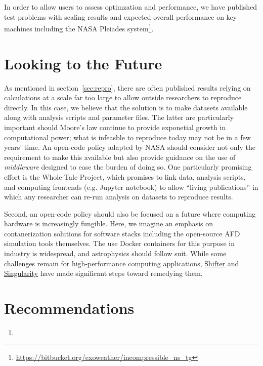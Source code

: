 \documentclass[12pt, titlepage]{aastex62}
\begin{document}
In order to allow users to assess optimzation and performance, we have published test problems with scaling results and expected overall performance on key machines including the NASA Pleiades system\footnote{\url{https://bitbucket.org/exoweather/incompressible_ns_tg}}. 

\section{Looking to the Future}
\label{sec:future}

As mentioned in section~\ref{sec:repro}, there are often published results relying on calculations at a scale far too large to allow outside researchers to reproduce directly. In this case, we believe that the solution is to make datasets available along with analysis scripts and parameter files. The latter are particularly important should Moore's law continue to provide exponetial growth in computational power; what is infeasble to reproduce today may not be in a few years' time. An open-code policy adapted by NASA should consider not only the requirement to make this available but also provide guidance on the use of \emph{middleware} designed to ease the burden of doing so. One particularly promising effort is the Whole Tale Project, which promises to link data, analysis scripts, and computing frontends (e.g. Jupyter notebook) to allow ``living publications'' in which any researcher can re-run analysis on datasets to reproduce results. 

Second, an open-code policy should also be focused on a future where computing hardware is increasingly fungible. Here, we imagine an emphasis on contanerization solutions for software stacks including the open-source AFD simulation tools themselves. The use Docker containers for this purpose in industry is widespread, and astrophysics should follow suit. While some challenges remain for high-performance computing applications, \href{https://github.com/NERSC/shifter}{Shifter} and \href{http://singularity.lbl.gov/}{Singularity} have made significant steps toward remedying them. 


\section{Recommendations}
\label{sec:recommendations}

\begin{enumerate}
\item 
\end{enumerate}

{\footnotesize
%

}
\end{document}

